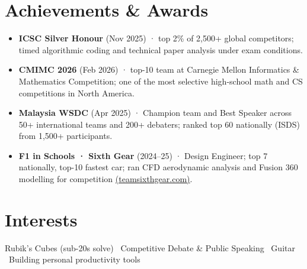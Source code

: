 \documentclass[10.4pt,letterpaper]{article}
\newenvironment{tlist}{%
  \begin{itemize}[leftmargin=1.3em, nosep, topsep=2pt, itemsep=0.5pt]%
  \small%
}{%
  \end{itemize}%
}
\begin{document}
\section{Achievements \& Awards}

\begin{tlist}
  \item \textbf{ICSC Silver Honour} (Nov 2025) · top 2\% of 2,500+ global competitors; timed algorithmic coding and technical paper analysis under exam conditions.
  \item \textbf{CMIMC 2026} (Feb 2026) · top-10 team at Carnegie Mellon Informatics \& Mathematics Competition; one of the most selective high-school math and CS competitions in North America.
  \item \textbf{Malaysia WSDC} (Apr 2025) · Champion team and Best Speaker across 50+ international teams and 200+ debaters; ranked top 60 nationally (ISDS) from 1,500+ participants.
  \item \textbf{F1 in Schools · Sixth Gear} (2024--25) · Design Engineer; top 7 nationally, top-10 fastest car; ran CFD aerodynamic analysis and Fusion 360 modelling for competition \href{https://www.teamsixthgear.com/}{(teamsixthgear.com)}.
\end{tlist}

\section{Interests}

\small Rubik's Cubes (sub-20s solve) \textbar\ Competitive Debate \& Public Speaking \textbar\ Guitar \textbar\ Building personal productivity tools
\end{document}
